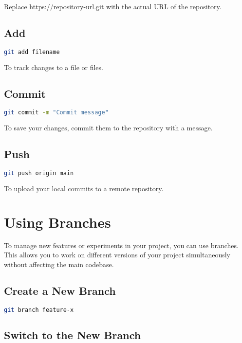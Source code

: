 \documentclass{article}
\begin{document}
Replace https://repository-url.git with the actual URL of the repository.

\subsection{Add}

\begin{lstlisting}[language=bash]
git add filename
\end{lstlisting}

To track changes to a file or files.

\subsection{Commit}

\begin{lstlisting}[language=bash]
git commit -m "Commit message"
\end{lstlisting}

To save your changes, commit them to the repository with a message.

\subsection{Push}

\begin{lstlisting}[language=bash]
git push origin main
\end{lstlisting}

To upload your local commits to a remote repository.

\section{Using Branches}

To manage new features or experiments in your project, you can use branches. This allows you to work on different versions of your project simultaneously without affecting the main codebase.

\subsection{Create a New Branch}

\begin{lstlisting}[language=bash]
git branch feature-x
\end{lstlisting}

\subsection{Switch to the New Branch}
\end{document}
